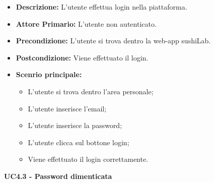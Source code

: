 \begin{itemize}
    \item \textbf{Descrizione:} L'utente effettua login nella piattaforma.
    \item \textbf{Attore Primario:} L'utente non autenticato.
    \item \textbf{Precondizione:} L'utente si trova dentro la web-app sushiLab.
    \item \textbf{Postcondizione:} Viene effettuato il login.
    \item \textbf{Scenrio principale:}
    \begin{itemize}
        \item L'utente si trova dentro l'area personale;
        \item L'utente inserisce l'email;
        \item L'utente inserisce la password;
        \item L'utente clicca sul bottone login;
        \item Viene effettuato il login correttamente.
    \end{itemize}
\end{itemize}
\textbf{UC4.3 - Password dimenticata}
